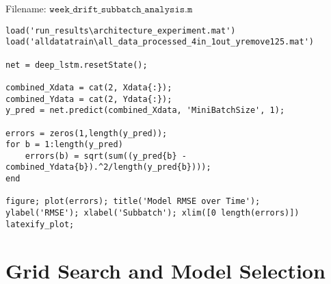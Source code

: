 Filename: $\texttt{week\_drift\_subbatch\_analysis.m}$
\begin{lstlisting}
load('run_results\architecture_experiment.mat')
load('alldatatrain\all_data_processed_4in_1out_yremove125.mat')

net = deep_lstm.resetState();

combined_Xdata = cat(2, Xdata{:});
combined_Ydata = cat(2, Ydata{:});
y_pred = net.predict(combined_Xdata, 'MiniBatchSize', 1);

errors = zeros(1,length(y_pred));
for b = 1:length(y_pred)
    errors(b) = sqrt(sum((y_pred{b} - combined_Ydata{b}).^2/length(y_pred{b})));
end

figure; plot(errors); title('Model RMSE over Time'); 
ylabel('RMSE'); xlabel('Subbatch'); xlim([0 length(errors)])
latexify_plot;
\end{lstlisting}

\section{Grid Search and Model Selection}

